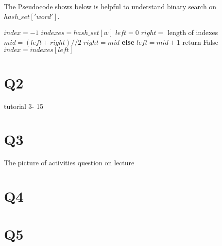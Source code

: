 \documentclass[a4paper]{article}
\begin{document}
	The Pseudocode shows below is helpful to understand binary search on $hash\_set['word']$.
	\begin{algorithm}[h]
  	\caption{}
  		\begin{algorithmic}[1]
  			\State $index = -1$
      			\State $indexes=hash\_set[w]$
      			\State $left=0$
      			\State $right=$ length of indexes
      				\State $mid = (left + right) // 2$
						\State $right=mid$ \textbf{else} $left=mid+1$
					\EndIf
 				\EndWhile
 					\State return False
 				\EndIf
 				\State $index = indexes[left]$
    		\EndFor
       		\label{code:recentEnd}
  		\end{algorithmic}
	\end{algorithm}

	\section*{Q2}
	tutorial 3- 15
	
	\section*{Q3}
	The picture of activities question on lecture
	\section*{Q4}
	\section*{Q5}
		
	
	
	
	
	
	
	
	
	
	
	
	
	
	
	
	
	
	
	
	
	
	
	
	
\end{document}
